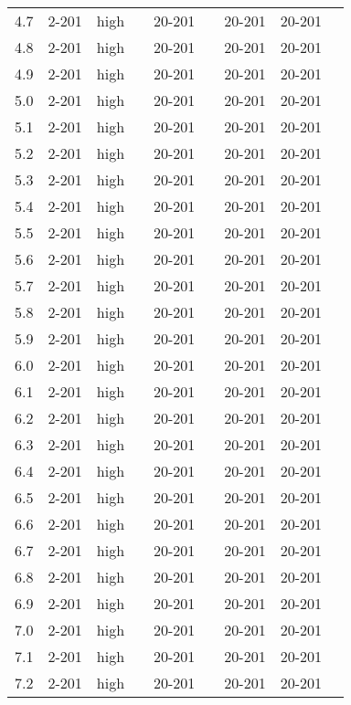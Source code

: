 \documentclass{article}
\begin{document}
\begin{center}
\begin{tabular}{| c | c | c | c | c | c | c | c | c |}
      4.7 & 2-201 & high &  & 20-201 &  & 20-201 & 20-201 &\\
      4.8 & 2-201 & high &  & 20-201 &  & 20-201 & 20-201 &\\
      4.9 & 2-201 & high &  & 20-201 &  & 20-201 & 20-201 &\\
      5.0 & 2-201 & high &  & 20-201 &  & 20-201 & 20-201 &\\
      5.1 & 2-201 & high &  & 20-201 &  & 20-201 & 20-201 &\\
      5.2 & 2-201 & high &  & 20-201 &  & 20-201 & 20-201 &\\
      5.3 & 2-201 & high &  & 20-201 &  & 20-201 & 20-201 &\\
      5.4 & 2-201 & high &  & 20-201 &  & 20-201 & 20-201 &\\
      5.5 & 2-201 & high &  & 20-201 &  & 20-201 & 20-201 &\\
      5.6 & 2-201 & high &  & 20-201 &  & 20-201 & 20-201 &\\
      5.7 & 2-201 & high &  & 20-201 &  & 20-201 & 20-201 &\\
      5.8 & 2-201 & high &  & 20-201 &  & 20-201 & 20-201 &\\
      5.9 & 2-201 & high &  & 20-201 &  & 20-201 & 20-201 &\\
      6.0 & 2-201 & high &  & 20-201 &  & 20-201 & 20-201 &\\
      6.1 & 2-201 & high &  & 20-201 &  & 20-201 & 20-201 &\\
      6.2 & 2-201 & high &  & 20-201 &  & 20-201 & 20-201 &\\
      6.3 & 2-201 & high &  & 20-201 &  & 20-201 & 20-201 &\\
      6.4 & 2-201 & high &  & 20-201 &  & 20-201 & 20-201 &\\
      6.5 & 2-201 & high &  & 20-201 &  & 20-201 & 20-201 &\\
      6.6 & 2-201 & high &  & 20-201 &  & 20-201 & 20-201 &\\
      6.7 & 2-201 & high &  & 20-201 &  & 20-201 & 20-201 &\\
      6.8 & 2-201 & high &  & 20-201 &  & 20-201 & 20-201 &\\
      6.9 & 2-201 & high &  & 20-201 &  & 20-201 & 20-201 &\\
      7.0 & 2-201 & high &  & 20-201 &  & 20-201 & 20-201 &\\
      7.1 & 2-201 & high &  & 20-201 &  & 20-201 & 20-201 &\\
      7.2 & 2-201 & high &  & 20-201 &  & 20-201 & 20-201 &\\

\end{tabular}
\end{center}
\end{document}
